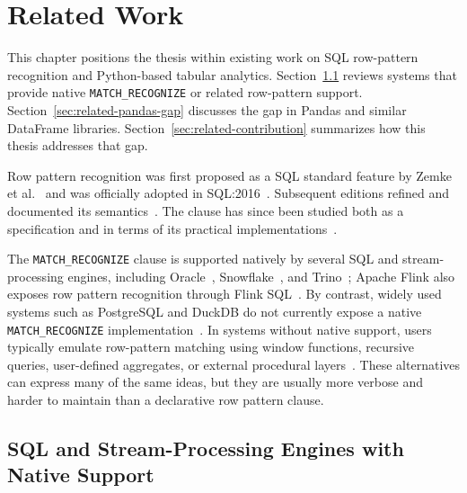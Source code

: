 \chapter{Related Work}
\label{chap:related}

This chapter positions the thesis within existing work on SQL
row-pattern recognition and Python-based tabular analytics.
Section~\ref{sec:related-native} reviews systems that provide native
\texttt{MATCH\_RECOGNIZE} or related row-pattern support.
Section~\ref{sec:related-pandas-gap} discusses the gap in Pandas and
similar DataFrame libraries.  Section~\ref{sec:related-contribution}
summarizes how this thesis addresses that gap.

Row pattern recognition was first proposed as a SQL standard feature
by Zemke et al.~\cite{zemke2007pattern} and was officially adopted
in SQL:2016~\cite{ISO2016SQL,iso2016}.
Subsequent editions refined and documented its
semantics~\cite{ISO2021,melton2017sqlrpr,michels2018new}.
The clause has since been studied both as a specification and in
terms of its practical
implementations~\cite{petkovic2022rpr,petkovic2022fraud}.

The \texttt{MATCH\_RECOGNIZE} clause is supported natively by
several SQL and stream-processing engines, including
Oracle~\cite{oracle2022,book},
Snowflake~\cite{snowflake2025match_recognize}, and
Trino~\cite{trino2022,trino2021row}; Apache Flink also exposes row
pattern recognition through Flink SQL~\cite{flink}.
By contrast, widely used systems such as PostgreSQL and DuckDB do
not currently expose a native \texttt{MATCH\_RECOGNIZE}
implementation~\cite{howe2020matchrecognize,findling2025bringing}.
In systems without native support, users typically emulate
row-pattern matching using window functions, recursive queries,
user-defined aggregates, or external procedural
layers~\cite{TURP2,TURP,cao2012optimizationanalyticwindowfunctions}.
These alternatives can express many of the same ideas, but they are
usually more verbose and harder to maintain than a declarative row
pattern clause.

\section{SQL and Stream-Processing Engines with Native Support}
\label{sec:related-native}

